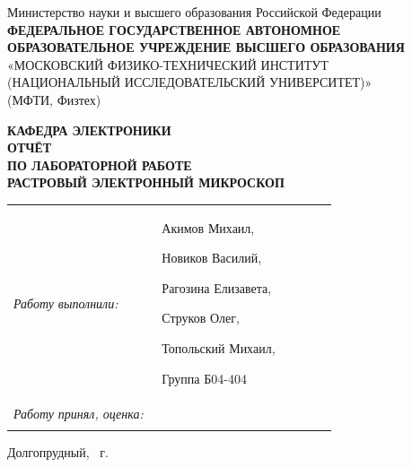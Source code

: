 \documentclass[12pt, a4paper]{article}
\begin{document}

\begin{titlepage}
\thispagestyle{empty}

\begin{center}
\small
Министерство науки и высшего образования Российской Федерации\\[2mm]
\textbf{ФЕДЕРАЛЬНОЕ ГОСУДАРСТВЕННОЕ АВТОНОМНОЕ
ОБРАЗОВАТЕЛЬНОЕ УЧРЕЖДЕНИЕ ВЫСШЕГО ОБРАЗОВАНИЯ}\\[1mm]
«МОСКОВСКИЙ ФИЗИКО-ТЕХНИЧЕСКИЙ ИНСТИТУТ\\
(НАЦИОНАЛЬНЫЙ ИССЛЕДОВАТЕЛЬСКИЙ УНИВЕРСИТЕТ)»\\
(МФТИ, Физтех)
\end{center}

\vspace{18mm}

\begin{center}
\large \textbf{КАФЕДРА ЭЛЕКТРОНИКИ}\\[10mm]
\Large \textbf{ОТЧЁТ}\\[2mm]
\large \textbf{ПО ЛАБОРАТОРНОЙ РАБОТЕ}\\[14mm]
\Large \textbf{РАСТРОВЫЙ ЭЛЕКТРОННЫЙ МИКРОСКОП}
\end{center}

\vfill

\noindent
\begin{tabular}{@{}p{0.44\linewidth}p{0.52\linewidth}@{}}
\textit{Работу выполнили:} & Акимов Михаил,

Новиков Василий,

Рагозина Елизавета,

Струков Олег,

Топольский Михаил,

Группа Б04-404 \\[8mm]

\textit{Работу принял, оценка:} & \\[3mm]
 \\
\end{tabular}


\vspace{12mm}

\begin{center}
\small Долгопрудный, \the\year{}~г.
\end{center}

\end{titlepage}
\end{document}
